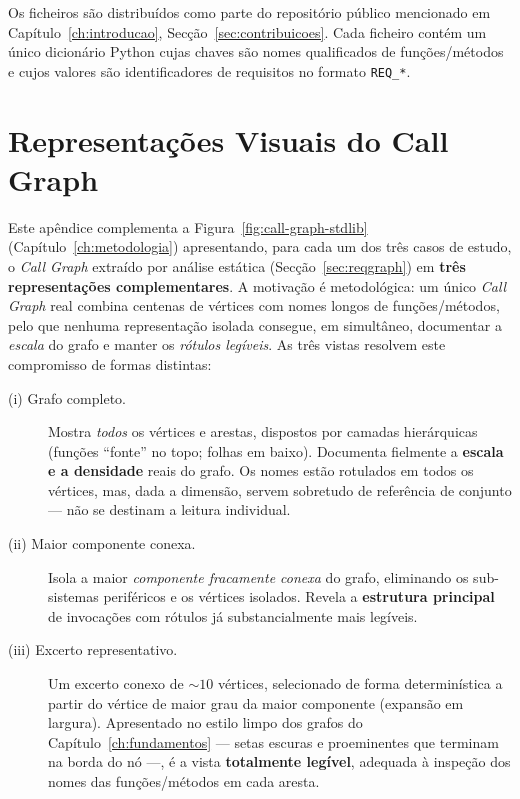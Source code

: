 Os ficheiros são distribuídos como parte do repositório público
mencionado em Capítulo~\ref{ch:introducao},
Secção~\ref{sec:contribuicoes}. Cada ficheiro contém um único
dicionário Python  cujas chaves são nomes
qualificados de funções/métodos e cujos valores são identificadores
de requisitos no formato \texttt{REQ\_*}.

\chapter{Representações Visuais do Call Graph}
\label{ap:callgraph-repr}

Este apêndice complementa a Figura~\ref{fig:call-graph-stdlib}
(Capítulo~\ref{ch:metodologia}) apresentando, para cada um dos três
casos de estudo, o \emph{Call Graph} extraído por análise estática
(Secção~\ref{sec:reqgraph}) em \textbf{três representações
complementares}. A motivação é metodológica: um único \emph{Call
Graph} real combina centenas de vértices com nomes longos de
funções/métodos, pelo que nenhuma representação isolada consegue, em
simultâneo, documentar a \emph{escala} do grafo e manter os
\emph{rótulos legíveis}. As três vistas resolvem este compromisso de
formas distintas:

\begin{description}
    \item[(i) Grafo completo.] Mostra \emph{todos} os vértices e
        arestas, dispostos por camadas hierárquicas (funções
        ``fonte'' no topo; folhas em baixo). Documenta fielmente a
        \textbf{escala e a densidade} reais do grafo. Os nomes estão
        rotulados em todos os vértices, mas, dada a dimensão, servem
        sobretudo de referência de conjunto --- não se destinam a
        leitura individual.
    \item[(ii) Maior componente conexa.] Isola a maior
        \emph{componente fracamente conexa} do grafo, eliminando os
        sub-sistemas periféricos e os vértices isolados. Revela a
        \textbf{estrutura principal} de invocações com rótulos já
        substancialmente mais legíveis.
    \item[(iii) Excerto representativo.] Um excerto conexo de
        $\sim\!10$ vértices, selecionado de forma determinística a
        partir do vértice de maior grau da maior componente
        (expansão em largura). Apresentado no estilo limpo dos grafos
        do Capítulo~\ref{ch:fundamentos} --- setas escuras e
        proeminentes que terminam na borda do nó ---, é a vista
        \textbf{totalmente legível}, adequada à inspeção dos nomes
        das funções/métodos em cada aresta.
\end{description}

